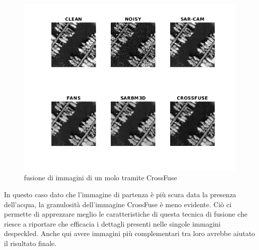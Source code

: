 \begin{figure}[H] 
  \centering
  \includegraphics[width=1.0\textwidth]{utils/CFharbor03.png}
  \caption{fusione di immagini di un molo tramite CrossFuse}
  \label{fig:harbor03CF}
\end{figure}
In questo caso dato che l'immagine di partenza è più scura data la presenza dell'acqua, la granulosità dell'immagine CrossFuse è meno evidente.
Ciò ci permette di apprezzare meglio le caratteristiche di questa tecnica di fusione che riesce a riportare che efficacia i dettagli presenti 
nelle singole immagini despeckled. Anche qui avere immagini più complementari tra loro avrebbe aiutato il risultato finale. 

